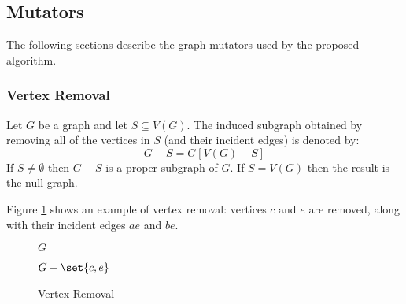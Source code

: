 \subsection{Mutators}

The following sections describe the graph mutators used by the proposed algorithm.

\subsubsection{Vertex Removal}

Let \(G\) be a graph and let \(S\subseteq V(G)\).  The induced subgraph obtained by removing all of the vertices in
\(S\) (and their incident edges) is denoted by:
\[G-S=G[V(G)-S]\]
If \(S\ne\emptyset\) then \(G-S\) is a proper subgraph of \(G\).  If \(S=V(G)\) then the result is the null graph.

Figure \ref{fig:vremove} shows an example of vertex removal: vertices \(c\) and \(e\) are removed, along with their
incident edges \(ae\) and \(be\).

\begin{figure}[h]
  \label{fig:vremove}
  \begin{minipage}{3in}
    \begin{center}

      \bigskip

      \(G\)
    \end{center}
  \end{minipage}
  \begin{minipage}{3in}
    \begin{center}

      \bigskip

      \(G-\set{c,e}\)
    \end{center}
  \end{minipage}
  \caption{Vertex Removal}
\end{figure}

